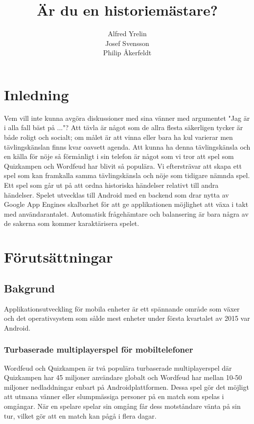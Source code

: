 \documentclass[12pt,a4paper]{article}
\author{Alfred Yrelin\\Josef Svensson\\Philip Åkerfeldt}
\title{Är du en historiemästare?}
\begin{document}
\maketitle
\newpage
\tableofcontents
\pagebreak

\section{Inledning}
Vem vill inte kunna avgöra diskussioner med sina vänner med argumentet "Jag är i alla fall bäst på ..."? 
Att tävla är något som de allra flesta säkerligen tycker är både roligt och socialt; om målet är att vinna eller bara ha kul varierar men tävlingskänslan finns kvar oavsett agenda. Att kunna ha denna tävlingskänsla och en källa för nöje så förmånligt i sin telefon är något som vi tror att spel som Quizkampen\cite{quiz} och Wordfeud har blivit så populära. Vi eftersträvar att skapa ett spel som kan framkalla samma tävlingskänsla och nöje som tidigare nämnda spel. Ett spel som går ut på att ordna historiska händelser relativt till andra händelser. Spelet utvecklas till Android med en backend som drar nytta av Google App Engines skalbarhet för att ge applikationen möjlighet att växa i takt med användarantalet. Automatisk frågehämtare och balansering är bara några av de sakerna som kommer karaktärisera spelet.


\section{Förutsättningar}

\subsection{Bakgrund}
Applikationsutveckling för mobila enheter är ett spännande område som växer\cite{trendforce} och det operativsystem som sålde mest enheter under första kvartalet av 2015 var Android. 

\subsubsection{Turbaserade multiplayerspel för mobiltelefoner}
Wordfeud och Quizkampen är två populära turbaserade multiplayerspel där Quizkampen har 45 miljoner användare globalt\cite{quiz} och Wordfeud har mellan 10-50 miljoner nedladdningar enbart på Androidplattformen\cite{wordfeud}. Dessa spel gör det möjligt att utmana vänner eller slumpmässiga personer på en match som spelas i omgångar. När en spelare spelar sin omgång får dess motståndare vänta på sin tur, vilket gör att en match kan pågå i flera dagar.
\end{document}
